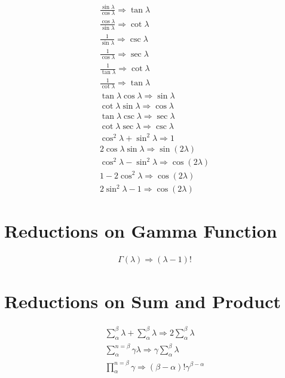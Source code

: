 \documentclass[11pt,a4paper]{book}
\begin{document}
\begin{eqnarray}
\frac{\sin\lambda}{\cos \lambda} \Rightarrow \tan \lambda \\
\frac{\cos \lambda}{\sin \lambda} \Rightarrow \cot \lambda \\
\frac{1}{\sin \lambda} \Rightarrow \csc\lambda \\
\frac{1}{\cos \lambda} \Rightarrow \sec\lambda \\
\frac{1}{\tan\lambda} \Rightarrow \cot \lambda \\
\frac{1}{\cot \lambda} \Rightarrow \tan \lambda \\
\tan \lambda \cos\lambda \Rightarrow \sin \lambda \\
\cot \lambda \sin \lambda \Rightarrow \cos \lambda \\
\tan \lambda \csc \lambda \Rightarrow \sec \lambda \\
\cot \lambda \sec \lambda \Rightarrow \csc \lambda \\
\cos^2 \lambda + \sin^2 \lambda \Rightarrow 1 \\
2 \cos \lambda \sin \lambda \Rightarrow \sin \left(2 \lambda\right) \\
\cos^2 \lambda - \sin^2 \lambda \Rightarrow \cos \left(2 \lambda \right) \\
1 - 2\cos^2\lambda \Rightarrow \cos \left(2 \lambda \right) \\
2\sin^2\lambda - 1 \Rightarrow \cos \left(2 \lambda \right)
\end{eqnarray}

\section{Reductions on Gamma Function}

\begin{eqnarray}
\Gamma(\lambda) \Rightarrow (\lambda - 1)!
\end{eqnarray}

\section{Reductions on Sum and Product}

\begin{eqnarray}
\sum_{\alpha}^{\beta} \lambda + \sum_{\alpha}^{\beta} \lambda \Rightarrow 2 \sum_{\alpha}^{\beta} \lambda \\
\sum_{\alpha}^{n = \beta} \gamma \lambda \Rightarrow \gamma \sum_{\alpha}^{\beta} \lambda \\
\prod_{\alpha}^{n = \beta} \gamma \Rightarrow \left( \beta - \alpha \right)! \gamma^{\beta - \alpha}
\end{eqnarray}
\end{document}
